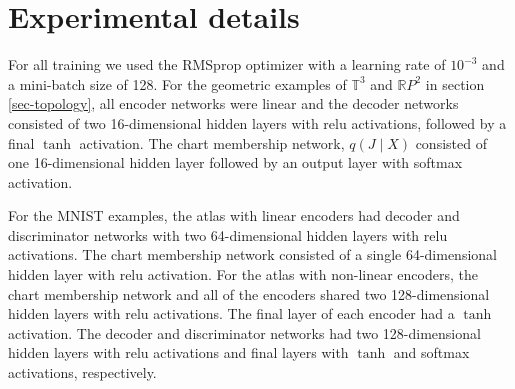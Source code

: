 \documentclass[reqno,11pt]{article}
\newcommand{\R}{\mathbb{R}}
\begin{document}
\pagebreak 



\appendix
\section{Experimental details}
For all training we used the RMSprop optimizer with a learning rate of $10^{-3}$ and a mini-batch size of 128. For the geometric examples of $\mathbb T^3$ and $\R P^2$ in section \ref{sec-topology}, all encoder networks were linear and the decoder networks consisted of two 16-dimensional hidden layers with relu activations, followed by a final $\tanh$ activation. The chart membership network, $q(J \mid X)$ consisted of one 16-dimensional hidden layer followed by an output layer with softmax activation.

For the MNIST examples, the atlas with linear encoders had decoder and discriminator networks with two 64-dimensional hidden layers with relu activations. The chart membership network consisted of a single 64-dimensional hidden layer with relu activation. For the atlas with non-linear encoders, the chart membership network and all of the encoders shared two 128-dimensional hidden layers with relu activations. The final layer of each encoder had a $\tanh$ activation. The decoder and discriminator networks had two 128-dimensional hidden layers with relu activations and final layers with $\tanh$ and softmax activations, respectively.
\end{document}
